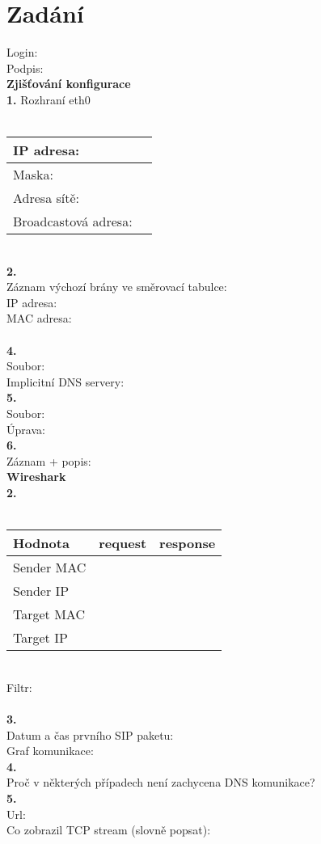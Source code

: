 \section{Zadání}
Login:\\
Podpis:\\

\textbf{Zjišťování konfigurace}\\
\textbf{1.} Rozhraní eth0\\
\\
\begin{tabular}{|l|r|}
\hline
IP adresa: & \hspace{12em} \\
\hline
Maska: & \\
\hline
Adresa sítě: & \\
\hline
Broadcastová adresa: & \\
\hline
\end{tabular}
\vspace{1.5em}
\\
\textbf{2.}\\
\vspace{3em}
Záznam výchozí brány ve směrovací tabulce:\\
IP adresa:\\
MAC adresa:\\
\\
\textbf{4.}\\
Soubor:\\
\vspace{8em}
Implicitní DNS servery:\\
\textbf{5.}\\
Soubor:\\
\vspace{4em}
Úprava:\\
\newpage
\noindent
\textbf{6.}\\
\vspace{5em}
Záznam + popis:\\
\noindent
\textbf{Wireshark}\\
\textbf{2.}\\
\\
\begin{tabular}{|l|c|c|}
\hline
\textbf{Hodnota} & \textbf{request} & \textbf{response}\\
\hline
Sender MAC & \hspace{10em} & \hspace{10em} \\
\hline
Sender IP & & \\
\hline
Target MAC & & \\
\hline
Target IP & & \\
\hline
\end{tabular}
\vspace{2em}
\\
Filtr:\\
\\
\textbf{3.}\\
Datum a čas prvního SIP paketu:\\
\vspace{25em}
Graf komunikace:\\
\textbf{4.}\\
\vspace{4em}
Proč v některých případech není zachycena DNS komunikace?\\
\textbf{5.}\\
Url:\\
Co zobrazil TCP stream (slovně popsat):\\
